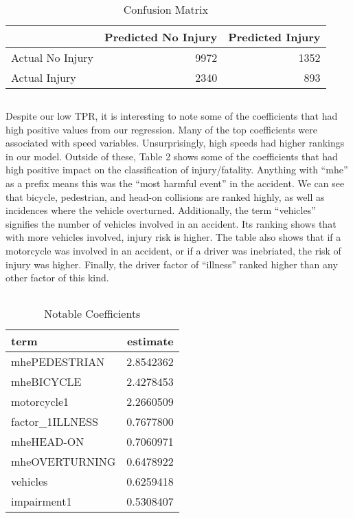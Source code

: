 \documentclass[
]{article}
\begin{document}
\begin{verbatim}
\end{verbatim}

\FloatBarrier
\begin{table}[!h]

\caption{\label{tab:unnamed-chunk-9}Confusion Matrix}
\centering
\begin{tabular}[t]{l|r|r}
\hline
  & Predicted No Injury & Predicted Injury\\
\hline
Actual No Injury & 9972 & 1352\\
\hline
Actual Injury & 2340 & 893\\
\hline
\end{tabular}
\end{table}
\FloatBarrier

\begin{verbatim}
\end{verbatim}

Despite our low TPR, it is interesting to note some of the coefficients
that had high positive values from our regression. Many of the top
coefficients were associated with speed variables. Unsurprisingly, high
speeds had higher rankings in our model. Outside of these, Table 2 shows
some of the coefficients that had high positive impact on the
classification of injury/fatality. Anything with ``mhe'' as a prefix
means this was the ``most harmful event'' in the accident. We can see
that bicycle, pedestrian, and head-on collisions are ranked highly, as
well as incidences where the vehicle overturned. Additionally, the term
``vehicles'' signifies the number of vehicles involved in an accident.
Its ranking shows that with more vehicles involved, injury risk is
higher. The table also shows that if a motorcycle was involved in an
accident, or if a driver was inebriated, the risk of injury was higher.
Finally, the driver factor of ``illness'' ranked higher than any other
factor of this kind.

\begin{verbatim}
\end{verbatim}

\FloatBarrier
\begin{table}[!h]

\caption{\label{tab:unnamed-chunk-11}Notable Coefficients}
\centering
\begin{tabular}[t]{l|r}
\hline
term & estimate\\
\hline
mhePEDESTRIAN & 2.8542362\\
\hline
mheBICYCLE & 2.4278453\\
\hline
motorcycle1 & 2.2660509\\
\hline
factor\_1ILLNESS & 0.7677800\\
\hline
mheHEAD-ON & 0.7060971\\
\hline
mheOVERTURNING & 0.6478922\\
\hline
vehicles & 0.6259418\\
\hline
impairment1 & 0.5308407\\
\hline
\end{tabular}
\end{table}
\FloatBarrier
\end{document}

